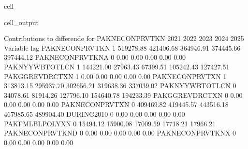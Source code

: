 \documentclass[letterpaper,10pt,english]{jupyterBook}
\begin{document}
\begin{sphinxuseclass}{cell}
\begin{sphinxVerbatimOutput}
\begin{sphinxuseclass}{cell_output}
\begin{sphinxVerbatim}[commandchars=\\\{\}]
 Contributions to differende for  PAKNECONPRVTKN
                           2021       2022       2023       2024       2025
Variable         lag                                                       
PAKNECONPRVTKN   \PYGZhy{}1  \PYGZhy{}519278.88 \PYGZhy{}421406.68 \PYGZhy{}364946.91 \PYGZhy{}374445.66 \PYGZhy{}397444.12
PAKNECONPRVTKN\PYGZus{}A  0        0.00       0.00       0.00       0.00       0.00
PAKNYYWBTOTLCN   \PYGZhy{}1   144221.00   27963.43  \PYGZhy{}67399.51 \PYGZhy{}105242.43 \PYGZhy{}127427.51
PAKGGREVDRCTXN   \PYGZhy{}1        0.00       0.00       0.00       0.00       0.00
PAKNECONPRVTXN   \PYGZhy{}1   313813.15  295937.70  302656.21  319638.36  337039.02
PAKNYYWBTOTLCN    0   \PYGZhy{}34078.61   81914.26  127796.10  154640.78  194233.39
PAKGGREVDRCTXN    0        0.00       0.00       0.00       0.00       0.00
PAKNECONPRVTXN    0  \PYGZhy{}409469.82 \PYGZhy{}419445.57 \PYGZhy{}443516.18 \PYGZhy{}467985.65 \PYGZhy{}489904.40
DURING\PYGZus{}2010       0        0.00       0.00       0.00       0.00       0.00
PAKFMLBLPOLYXN    0   \PYGZhy{}15494.12  \PYGZhy{}15900.08  \PYGZhy{}17009.59  \PYGZhy{}17718.21  \PYGZhy{}17966.21
PAKNECONPRVTKN\PYGZus{}D  0        0.00       0.00       0.00       0.00       0.00
PAKNECONPRVTKN\PYGZus{}X  0        0.00       0.00       0.00       0.00       0.00


\end{sphinxVerbatim}
\end{sphinxuseclass}
\end{sphinxVerbatimOutput}
\end{sphinxuseclass}
\end{document}
